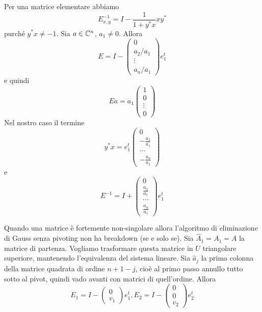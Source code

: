 \documentclass[a4paper]{article}
\begin{document}
Per una matrice elementare abbiamo
\[
    E^{-1}_{x,y} = I - \frac{1}{1 + y^*x}xy^*
\]
purché \(y^*x \neq -1\).
Sia \(a \in \mathbb{C}^n\), \(a_1 \neq 0\).
Allora \[
    E = I -
    \begin{pmatrix}
        0 \\ a_2/a_1 \\ \vdots \\ a_n/a_1
    \end{pmatrix}
    e_1^t
\]
e quindi
\[
    Ea = a_1
    \begin{pmatrix}
        1 \\ 0 \\ \vdots \\ 0
    \end{pmatrix}
\]
Nel nostro caso il termine \[
    y^*x = e_1^t
    \begin{pmatrix}
        0 \\ - \frac{a_2}{a_1} \\ \cdots \\ - \frac{a_n}{a_1}
    \end{pmatrix}
\]
e
\[
    E^{-1} = I +
    \begin{pmatrix}
        0 \\ \frac{a_2}{a_1} \\ \cdots \\ \frac{a_n}{a_1}
    \end{pmatrix} e_1^t
\]

Quando una matrice è fortemente non-singolare allora l'algoritmo
di eliminazione di Gauss senza pivoting
non ha breakdown (se e solo se).
Sia \(\hat A_1 = A_1 = A\) la matrice di partenza.
Vogliamo trasformare questa matrice in \(U\) triangolare superiore,
mantenendo l'equivalenza del sistema lineare.
Sia \(\hat a_j\)
la prima colonna della matrice quadrata
di ordine \(n+1-j\),
cioè al primo passo annullo tutto sotto al pivot, quindi vado avanti
con matrici di quell'ordine.
Allora
\[
    E_1 = I -
    \begin{pmatrix}
        0 \\ v_1
    \end{pmatrix}e_1^t, E_2 = I -
    \begin{pmatrix}
        0 \\ 0 \\ v_2
    \end{pmatrix}e_2^t
\]
\end{document}
